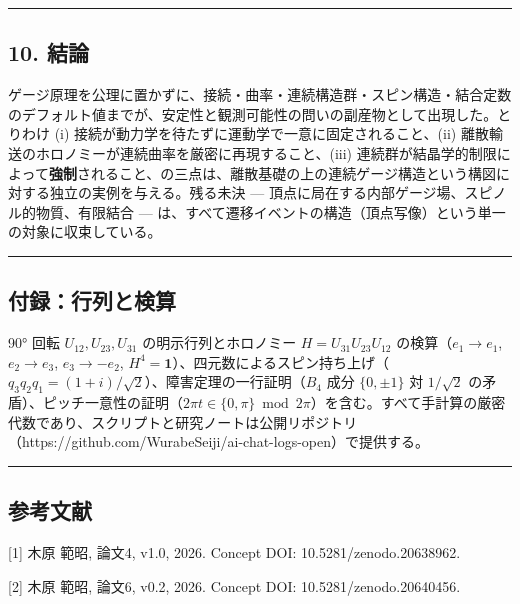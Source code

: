 \documentclass[
]{ltjsarticle}
\begin{document}
\begin{center}\rule{0.5\linewidth}{0.5pt}\end{center}

\subsection{10. 結論}\label{ux7d50ux8ad6}

ゲージ原理を公理に置かずに、接続・曲率・連続構造群・スピン構造・結合定数のデフォルト値までが、安定性と観測可能性の問いの副産物として出現した。とりわけ
(i) 接続が動力学を待たずに運動学で一意に固定されること、(ii)
離散輸送のホロノミーが連続曲率を厳密に再現すること、(iii)
連続群が結晶学的制限によって\textbf{強制}されること、の三点は、離散基礎の上の連続ゲージ構造という構図に対する独立の実例を与える。残る未決
--- 頂点に局在する内部ゲージ場、スピノル的物質、有限結合 ---
は、すべて遷移イベントの構造（頂点写像）という単一の対象に収束している。

\begin{center}\rule{0.5\linewidth}{0.5pt}\end{center}

\subsection{付録：行列と検算}\label{ux4ed8ux9332ux884cux5217ux3068ux691cux7b97}

90° 回転 \(U_{12},U_{23},U_{31}\) の明示行列とホロノミー
\(H=U_{31}U_{23}U_{12}\) の検算（\(e_1\to e_1\), \(e_2\to e_3\),
\(e_3\to-e_2\),
\(H^4=\mathbf{1}\)）、四元数によるスピン持ち上げ（\(q_3q_2q_1=(1+i)/\sqrt2\)）、障害定理の一行証明（\(B_4\)
成分 \(\{0,\pm1\}\) 対 \(1/\sqrt2\)
の矛盾）、ピッチ一意性の証明（\(2\pi t\in\{0,\pi\}\bmod 2\pi\)）を含む。すべて手計算の厳密代数であり、スクリプトと研究ノートは公開リポジトリ（https://github.com/WurabeSeiji/ai-chat-logs-open）で提供する。

\begin{center}\rule{0.5\linewidth}{0.5pt}\end{center}

\subsection{参考文献}\label{ux53c2ux8003ux6587ux732e}

{[}1{]} 木原 範昭, 論文4, v1.0, 2026. Concept DOI:
10.5281/zenodo.20638962.

{[}2{]} 木原 範昭, 論文6, v0.2, 2026. Concept DOI: 10.5281/zenodo.20640456.
\end{document}
